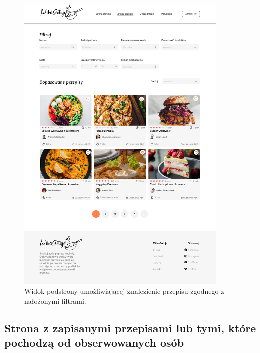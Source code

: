 \documentclass{article}
\begin{document}
\begin{figure}[H]
    \begin{center}
        \includegraphics[width=0.9\textwidth]{mockups/find_recipe}
    \end{center}
    \caption{Widok podstrony umożliwiającej znalezienie przepisu zgodnego z nałożonymi filtrami.}
    \label{fig:find_recipe}
\end{figure}

\newpage

\subsection{Strona z zapisanymi przepisami lub tymi, które pochodzą od obserwowanych osób}
\end{document}
